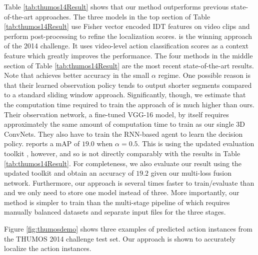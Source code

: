 \documentclass[10pt,twocolumn,letterpaper]{article}
\begin{document}
Table \ref{tab:thumos14Result} shows that our method outperforms previous state-of-the-art approaches.
The three models in the top section of Table \ref{tab:thumos14Result} use Fisher vector encoded IDT features on video clips and perform post-processing to refine the localization scores. \cite{learThumos2014} is the winning approach of the 2014 challenge. It uses video-level action classification scores as a context feature which greatly improves the performance.
The four methods in the middle section of Table \ref{tab:thumos14Result} are the most recent state-of-the-art results. 
Note that \cite{frame_glimpse_yeung_cvpr16} achieves better accuracy in the small $\alpha$ regime. One possible reason is that their learned observation policy tends to output shorter segments compared to a standard sliding window approach.
Significantly, though, we estimate that the computation time required to train the approach of \cite{frame_glimpse_yeung_cvpr16} is much higher than ours. Their observation network, a fine-tuned VGG-16 model, by itself requires approximately the same amount of computation time to train as our single 3D ConvNets. They also have to train the RNN-based agent to learn the decision policy.
\cite{scnn_shou_wang_chang_cvpr16} reports a mAP of $19.0$ when $\alpha = 0.5$. This is using the updated evaluation toolkit \cite{THUMOS14}, however, and so is not directly comparably with  the results in Table \ref{tab:thumos14Result}. For completeness, we also evaluate our result using the updated toolkit and obtain an accuracy of $19.2$ given our multi-loss fusion network. 
Furthermore, our approach is several times faster to train/evaluate than \cite{scnn_shou_wang_chang_cvpr16} and we only need to store one model instead of three. More importantly, our method is simpler to train than the multi-stage pipeline of \cite{scnn_shou_wang_chang_cvpr16} which requires manually balanced datasets and separate input files for the three stages.


Figure \ref{fig:thumosdemo} shows three examples of predicted action instances from the THUMOS 2014 challenge test set. Our approach is shown to accurately localize the action instances. 
\end{document}
